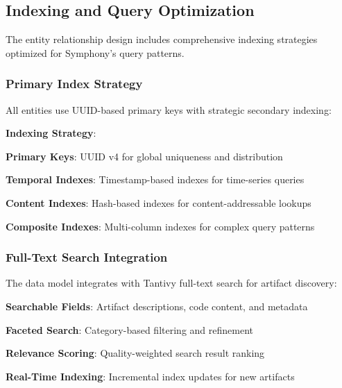 \subsection*{Indexing and Query Optimization}

The entity relationship design includes comprehensive indexing strategies optimized for Symphony's query patterns.

\subsubsection*{Primary Index Strategy}

All entities use UUID-based primary keys with strategic secondary indexing:

\begin{alertbox}
\textbf{Indexing Strategy}:
\begin{compactlist}
    \item \textbf{Primary Keys}: UUID v4 for global uniqueness and distribution
    \item \textbf{Temporal Indexes}: Timestamp-based indexes for time-series queries
    \item \textbf{Content Indexes}: Hash-based indexes for content-addressable lookups
    \item \textbf{Composite Indexes}: Multi-column indexes for complex query patterns
\end{compactlist}
\end{alertbox}

\subsubsection*{Full-Text Search Integration}

The data model integrates with Tantivy full-text search for artifact discovery:

\begin{compactlist}
    \item \textbf{Searchable Fields}: Artifact descriptions, code content, and metadata
    \item \textbf{Faceted Search}: Category-based filtering and refinement
    \item \textbf{Relevance Scoring}: Quality-weighted search result ranking
    \item \textbf{Real-Time Indexing}: Incremental index updates for new artifacts
\end{compactlist}

